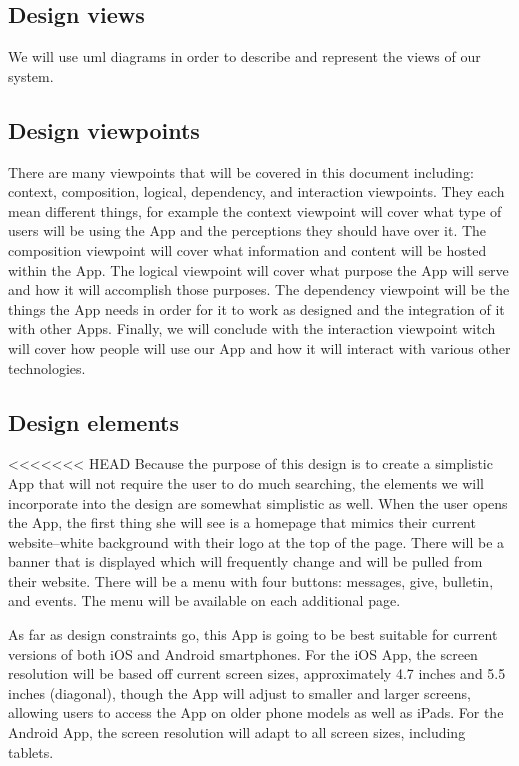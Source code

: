 \documentclass[letterpaper,10pt,draftclsnofoot,onecolumn,titlepage]{IEEEtran}
\begin{document}
		\subsection{Design views}
		We will use \gls{uml} diagrams in order to describe and represent the views of our system.

		\subsection{Design viewpoints}
		There are many viewpoints that will be covered in this document including: context, composition, logical, dependency, and interaction viewpoints.
		They each mean different things, for example the context viewpoint will cover what type of users will be using the \gls{App} and the perceptions they should have over it.
		The composition viewpoint will cover what information and content will be hosted within the \gls{App}.
		The logical viewpoint will cover what purpose the \gls{App} will serve and how it will accomplish those purposes.
		The dependency viewpoint will be the things the \gls{App} needs in order for it to work as designed and the integration of it with other \glspl{App}.
		Finally, we will conclude with the interaction viewpoint witch will cover how people will use our \gls{App} and how it will interact with various other technologies.

		\subsection{Design elements}
<<<<<<< HEAD
			Because the purpose of this design is to create a simplistic \gls{App} that will not require the user to do much searching, the elements we will incorporate into the design are somewhat simplistic as well.
			When the user opens the \gls{App}, the first thing she will see is a homepage that mimics their current website--white background with their logo at the top of the page.
			There will be a banner that is displayed which will frequently change and will be pulled from their website.
			There will be a menu with four buttons: messages, give, bulletin, and events.
			The menu will be available on each additional page.

			As far as design constraints go, this \gls{App} is going to be best suitable for current versions of both \gls{iOS} and \gls{Android} smartphones.
			For the \gls{iOS} \gls{App}, the screen resolution will be based off current screen sizes, approximately 4.7 inches and 5.5 inches (diagonal), though the \gls{App} will adjust to smaller and larger screens, allowing users to access the \gls{App} on older phone models as well as iPads.
			For the \gls{Android} \gls{App}, the screen resolution will adapt to all screen sizes, including tablets.
\end{document}

